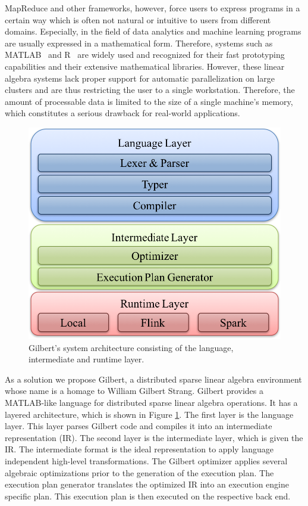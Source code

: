 MapReduce and other frameworks, however, force users to express programs in a certain way which is often not natural or intuitive to users from different domains.
Especially, in the field of data analytics and machine learning programs are usually expressed in a mathematical form.
Therefore, systems such as MATLAB~\cite{matlab} and R~\cite{r:1993a} are widely used and recognized for their fast prototyping capabilities and their extensive mathematical libraries.
However, these linear algebra systems lack proper support for automatic parallelization on large clusters and are thus restricting the user to a single workstation.
Therefore, the amount of processable data is limited to the size of a single machine's memory, which constitutes a serious drawback for real-world applications.

\begin{figure}[!h]
\centering
\includegraphics[height=0.15\paperheight]{images/systemArchitecture2.png}
\caption{Gilbert's system architecture consisting of the language, intermediate and runtime layer.}
\label{fig:systemArchitecture}
\end{figure}

As a solution we propose Gilbert, a distributed sparse linear algebra environment whose name is a homage to William Gilbert Strang.
Gilbert provides a MATLAB-like language for distributed sparse linear algebra operations. 
It has a layered architecture, which is shown in Figure \ref{fig:systemArchitecture}. 
The first layer is the language layer. 
This layer parses Gilbert code and compiles it into an intermediate representation (IR). 
The second layer is the intermediate layer, which is given the IR. 
The intermediate format is the ideal representation to apply language independent high-level transformations. 
The Gilbert optimizer applies several algebraic optimizations prior to the generation of the execution plan. 
The execution plan generator translates the optimized IR into an execution engine specific plan.
This execution plan is then executed on the respective back end. 

